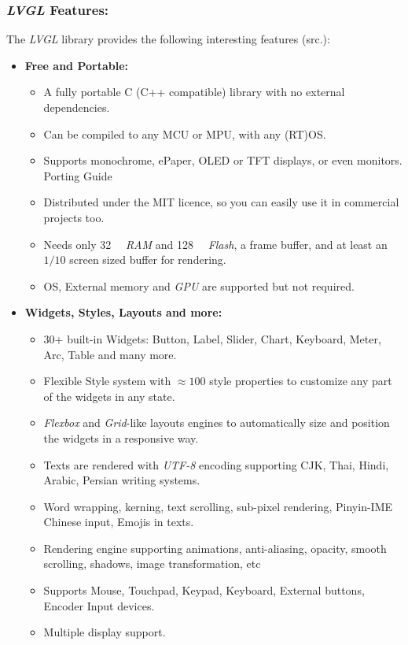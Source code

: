 \documentclass[report.tex]{subfiles}
\begin{document}
\subsubsection{\textit{LVGL} Features:}
\begin{flushleft}
The \textit{LVGL} library provides the following interesting features (src.\cite{lvgl_lib}):
\end{flushleft}

\begin{itemize}
\item \textbf{Free and Portable:}
\begin{itemize}
\item A fully portable C (C++ compatible) library with no external dependencies.
\item Can be compiled to any MCU or MPU, with any (RT)OS.
\item Supports monochrome, ePaper, OLED or TFT displays, or even monitors. Porting Guide
\item Distributed under the MIT licence, so you can easily use it in commercial projects too.
\item Needs only \SI{32}{\kilo\byte} \textit{RAM} and \SI{128}{\kilo\byte} \textit{Flash}, a frame buffer, and at least an $1/10$ screen sized buffer for rendering.
\item OS, External memory and \textit{GPU} are supported but not required.
\end{itemize}
\item \textbf{Widgets, Styles, Layouts and more:}
\begin{itemize}
\item 30+ built-in Widgets:  Button, Label, Slider, Chart, Keyboard, Meter, Arc, Table and many more.
\item Flexible Style system with $\approx 100$ style properties to customize any part of the widgets in any state.
\item \textit{Flexbox} and \textit{Grid}-like layouts engines to automatically size and position the widgets in a responsive way.
\item Texts are rendered with \textit{UTF-8} encoding supporting CJK, Thai, Hindi, Arabic, Persian writing systems.
\item Word wrapping, kerning, text scrolling, sub-pixel rendering, Pinyin-IME Chinese input, Emojis in texts.
\item Rendering engine supporting animations, anti-aliasing, opacity, smooth scrolling, shadows, image transformation, etc  
\item Supports Mouse, Touchpad, Keypad, Keyboard, External buttons, Encoder Input devices.
\item Multiple display support.
\end{itemize}
\end{itemize}
\end{document}
